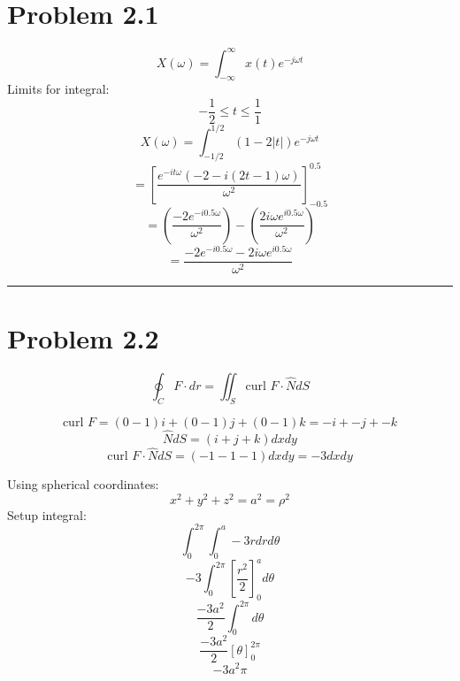 \section*{Problem 2.1}
$$X(\omega)=\int_{-\infty}^\infty x(t)e^{-j\omega t}$$
Limits for integral:
$$-\frac{1}{2}\leq t \leq \frac{1}{1}$$
$$X(\omega)=\int_{-1/2}^{1/2} (1-2|t|)e^{-j\omega t}$$
$$=\left[\frac{e^{-i t \omega} (-2-i (2 t-1) \omega)}{\omega^2}\right]_{-0.5}^{0.5}$$
$$=\left(\frac{-2e^{-i 0.5 \omega}}{\omega^2}\right)-\left(\frac{2i\omega e^{i 0.5 \omega}}{\omega^2}\right)$$
$$=\frac{-2e^{-i 0.5 \omega}-2i\omega e^{i 0.5 \omega}}{\omega^2}$$
\rule{\textwidth}{0.5pt}

\section*{Problem 2.2}
$$\oint_{C}F\cdot dr=\iint_{S}\text{curl }F\cdot\widehat{N}dS$$

$$\text{curl }F=(0-1)i+(0-1)j+(0-1)k=-i+-j+-k$$
$$\widehat{N}dS=(i+j+k)dxdy$$
$$\text{curl }F\cdot\widehat{N}dS=(-1-1-1)dxdy=-3dxdy$$

Using spherical coordinates:
$$x^2+y^2+z^2=a^2=\rho^2$$
Setup integral:
$$\int_0^{2\pi}\int_0^a -3 rdrd\theta$$
$$-3\int_0^{2\pi}\left[\frac{r^2}{2}\right]_0^a d\theta$$
$$\frac{-3a^2}{2}\int_0^{2\pi} d\theta$$
$$\frac{-3a^2}{2}\left[ \theta \right]_0^{2\pi}$$
$$-3a^2\pi$$

